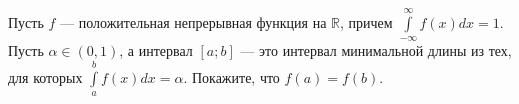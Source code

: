 \documentclass{article}
\begin{document}
Пусть $f$ --- положительная непрерывная функция на $\mathbb{R}$, причем $\int\limits_{-\infty}^\infty f(x) dx = 1$. Пусть $\alpha \in (0,1)$, а интервал $[a;b]$ --- это интервал минимальной длины из тех, для которых $\int\limits_a^b f(x) dx = \alpha$. Покажите, что $f(a)=f(b)$.
\end{document}
